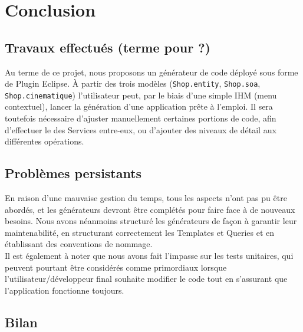 \chapter{Conclusion}\label{chap:COnc}


\section{Travaux effectués (terme pour  ?)}

Au terme de ce projet, nous proposons un générateur de code déployé sous forme de Plugin Eclipse. À partir des trois modèles (\verb+Shop.entity+, \verb+Shop.soa+, \verb+Shop.cinematique+) l'utilisateur peut, par le biais d'une simple IHM (menu contextuel), lancer la génération d'une application \kwplay prête à l'emploi. Il sera toutefois nécessaire d'ajuster manuellement certaines portions de code, afin d'effectuer le  des Services entre-eux, ou d'ajouter des niveaux de détail aux différentes opérations.


\section{Problèmes persistants}

En raison d'une mauvaise gestion du temps, tous les aspects n'ont pas pu être abordés, et les générateurs devront être complétés pour faire face à de nouveaux besoins. Nous avons néanmoins structuré les générateurs de façon à garantir leur maintenabilité, en structurant correctement les Templates et Queries et en établissant des conventions de nommage.\\
Il est également à noter que nous avons fait l'impasse sur les tests unitaires, qui peuvent pourtant être considérés comme primordiaux lorsque l'utilisateur/développeur final souhaite modifier le code tout en s'assurant que l'application fonctionne toujours.

\section{Bilan}

